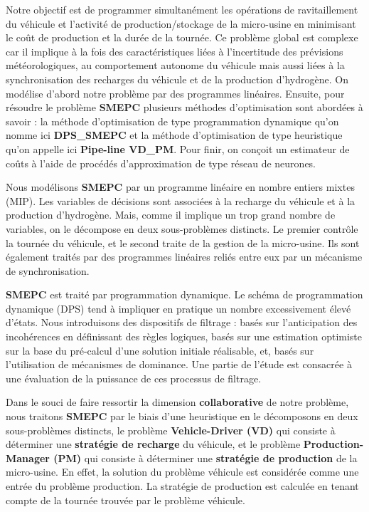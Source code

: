 \documentclass[11pt,a4paper]{report}
\begin{document}
Notre objectif est de programmer simultanément les opérations de ravitaillement du véhicule et l'activité
de production/stockage de la micro-usine en minimisant le coût de production et la durée de la tournée.
Ce problème global est complexe car il implique à la fois des caractéristiques liées à l'incertitude des
prévisions météorologiques, au comportement autonome du véhicule mais aussi liées à la synchronisation
des recharges du véhicule et de la production d'hydrogène.
On modélise d'abord notre problème par des programmes linéaires.
Ensuite, pour résoudre le problème \textbf{SMEPC} plusieurs méthodes d'optimisation sont abordées à savoir : la méthode d'optimisation de type
programmation dynamique qu'on nomme ici \textbf{DPS\_SMEPC} et la méthode d'optimisation de type heuristique qu'on appelle ici \textbf{Pipe-line VD\_PM}. Pour finir, on conçoit un estimateur de coûts à l'aide de procédés d'approximation de type réseau de neurones.

Nous modélisons \textbf{SMEPC} par un programme linéaire en nombre entiers mixtes (MIP). Les variables de décisions sont associées à la recharge du véhicule et à la production d'hydrogène. Mais, comme il implique un trop grand nombre de variables, on le décompose en deux sous-problèmes distincts. Le	premier contrôle la tournée du véhicule, et le second traite de la gestion de la micro-usine. Ils sont également traités par des programmes linéaires reliés entre eux par un mécanisme de synchronisation.

\textbf{SMEPC} est traité par programmation dynamique. Le schéma de programmation dynamique (DPS) tend
à impliquer en pratique un nombre excessivement élevé d'états. Nous introduisons des
dispositifs de filtrage : basés sur l'anticipation des incohérences en définissant des règles logiques, basés sur une estimation optimiste sur la base du pré-calcul d'une solution initiale réalisable, et, basés sur l'utilisation de mécanismes de dominance.
Une partie de l'étude est consacrée à une évaluation de la puissance de ces processus de filtrage.

Dans le souci de faire ressortir la dimension \textbf{collaborative} de notre problème, nous traitons \textbf{SMEPC} par le biais d'une heuristique en le décomposons en deux sous-problèmes
distincts, le problème \textbf{Vehicle-Driver (VD)} qui consiste à déterminer une \textbf{stratégie de recharge} du véhicule, et le
problème \textbf{Production-Manager (PM)} qui consiste à déterminer une \textbf{stratégie de production} de la micro-usine. 
En effet, la solution du problème véhicule est considérée comme une entrée du problème production. La
stratégie de production est calculée en tenant compte de la tournée trouvée par le problème véhicule.
\end{document}
